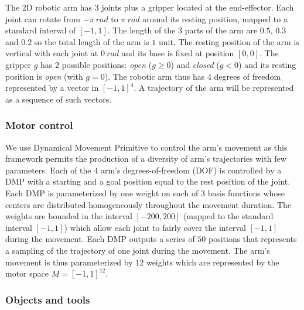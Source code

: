 \documentclass[10pt,letterpaper]{article}
\begin{document}
			The 2D robotic arm has 3 joints plus a gripper located at the end-effector.
			Each joint can rotate from $-\pi~rad$ to $\pi~rad$ around its resting position, mapped to a standard interval of $[-1,1]$.
			The length of the 3 parts of the arm are $0.5$, $0.3$ and $0.2$ so the total length of the arm is $1$ unit.
			The resting position of the arm is vertical with each joint at $0~rad$ and its base is fixed at position $[0, 0]$.
			The gripper $g$ has 2 possible positions: \textit{open} ($g \geq 0$) and \textit{closed} ($g < 0$) and its resting position is \textit{open} (with $g = 0$).
			The robotic arm thus has 4 degrees of freedom represented by a vector in $[-1,1]^4$.
			A trajectory of the arm will be represented as a sequence of such vectors.\\
		
		
		\subsubsection{Motor control}
		
			We use Dynamical Movement Primitive \cite{ijspeert_dynamical_2013} to control the arm's movement as this framework permits the production of a diversity of arm's trajectories with few parameters.
			Each of the $4$ arm's degrees-of-freedom (DOF) is controlled by a DMP with a starting and a goal position equal to the rest position of the joint.
			Each DMP is parameterized by one weight on each of $3$ basis functions whose centers are distributed homogeneously throughout the movement duration.
			The weights are bounded in the interval $[-200,200]$ (mapped to the standard interval $[-1,1]$) which allow each joint to fairly cover the interval $[-1,1]$ during the movement.
			Each DMP outputs a series of $50$ positions that represents a sampling of the trajectory of one joint during the movement.		
			The arm's movement is thus parameterized by $12$ weights which are represented by the motor space $M=[-1,1]^{12}$.\\
		
			
		\subsubsection{Objects and tools}
			
\end{document}
